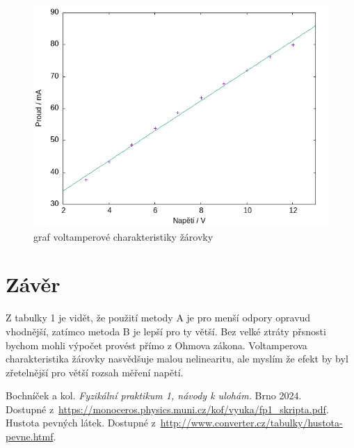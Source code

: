 \documentclass[a4paper,11pt]{article}
\begin{document}
\begin{figure}[htpb]
  \centering
  \includegraphics[width=0.7\linewidth]{zarovka-graf.png}
  \caption{graf voltamperové charakteristiky žárovky}
\end{figure}


\section{Závěr} 

Z tabulky 1 je vidět, že použití metody A je pro menší odpory opravud vhodnější, zatímco metoda B je lepší pro ty větší.
Bez velké ztráty přsnosti bychom mohli výpočet provést přímo z Ohmova zákona.
Voltamperova charakteristika žárovky nasvědšuje malou nelinearitu, ale myslím že efekt by 
byl zřetelnější pro větší rozsah měření napětí.



\begin{thebibliography}{0}
 Bochníček a kol. \textit{Fyzikální praktikum 1, návody k ulohám.} Brno 2024.\\ Dostupné z~\url{https://monoceros.physics.muni.cz/kof/vyuka/fp1_skripta.pdf}.   
 Hustota pevných látek. Dostupné z~\url{http://www.converter.cz/tabulky/hustota-pevne.htmf}.   
\end{thebibliography}
\end{document}
